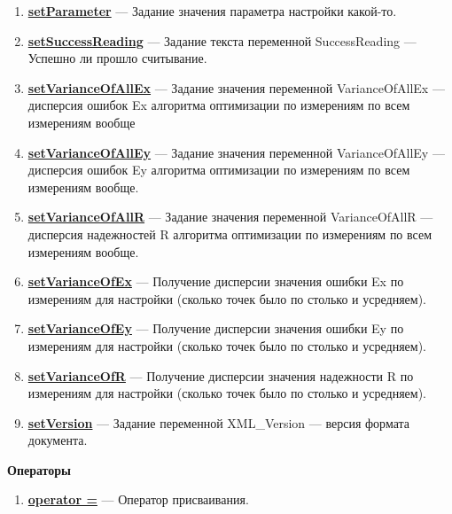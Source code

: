 \documentclass[a4paper,12pt]{article}
\begin{document}
\begin{enumerate}
	\item \textbf{\hyperref[setParameter]{setParameter}} --- Задание значения параметра настройки какой-то.
	
	\item \textbf{\hyperref[setSuccessReading]{setSuccessReading}} --- Задание текста переменной SuccessReading --- Успешно ли прошло считывание.
	
	\item \textbf{\hyperref[setVarianceOfAllEx]{setVarianceOfAllEx}} --- Задание значения переменной VarianceOfAllEx --- дисперсия ошибок Ex алгоритма оптимизации по измерениям по всем измерениям вообще
	
	\item \textbf{\hyperref[setVarianceOfAllEy]{setVarianceOfAllEy}} --- Задание значения переменной VarianceOfAllEy --- дисперсия ошибок Ey алгоритма оптимизации по измерениям по всем измерениям вообще.
	
	\item \textbf{\hyperref[setVarianceOfAllR]{setVarianceOfAllR}} --- Задание значения переменной VarianceOfAllR --- дисперсия надежностей R алгоритма оптимизации по измерениям по всем измерениям вообще.
	
	\item \textbf{\hyperref[setVarianceOfEx]{setVarianceOfEx}} --- Получение дисперсии значения ошибки Ex по измерениям для настройки (сколько точек было по столько и усредняем).
	
	\item \textbf{\hyperref[setVarianceOfEy]{setVarianceOfEy}} --- Получение дисперсии значения ошибки Ey по измерениям для настройки (сколько точек было по столько и усредняем).
	
	\item \textbf{\hyperref[setVarianceOfR]{setVarianceOfR}} --- Получение дисперсии значения надежности R по измерениям для настройки (сколько точек было по столько и усредняем).
	
	\item \textbf{\hyperref[setVersion]{setVersion}} --- Задание переменной XML\_Version --- версия формата документа.
	
\end{enumerate}

\textbf{Операторы}
\begin{enumerate}
	
	\item \textbf{\hyperref[operator =]{operator =}} --- Оператор присваивания.
	
\end{enumerate}
\end{document}
